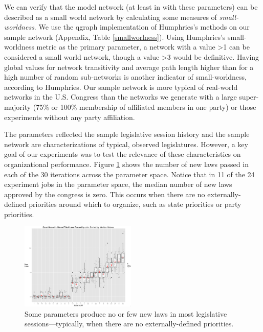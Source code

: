\documentclass[pdftex,12pt]{llncs}
\begin{document}
We can verify that the model network (at least in with these parameters) can be described as a small world network by calculating some measures of \textit{small-worldness}. 
We use the qgraph implementation \parencite{ec12} of Humphries's methods \parencite{hg08} on our sample network (Appendix, Table \ref{smallworlness}). 
Using Humphries's small-worldness metric as the primary parameter, a network with a value \textgreater 1 can be considered a small world network, though a value \textgreater 3 would be definitive. 
Having global values for network transitivity and average path length higher than for a high number of random sub-networks is another indicator of small-worldness, according to Humphries. 
Our sample network is more typical of real-world networks in the U.S. Congress than the networks we generate with a large super-majority (75\% or 100\% membership of affiliated members in one party) or those experiments without any party affiliation. 

The parameters reflected the sample legislative session history and the sample network are characterizations of typical, observed legislatures. 
However, a key goal of our experiments was to test the relevance of these characteristics on organizational performance.  
Figure \ref{newlaws} shows the number of new laws passed in each of the 30 iterations across the parameter space. 
Notice that in 11 of the 24 experiment jobs in the parameter space, the median number of new laws approved by the congress is zero.
This occurs when there are no externally-defined priorities around which to organize, such as state priorities or party priorities.

\begin{figure}
  \includegraphics[width=0.49\textwidth]{laws_byJob_jitterQuants.eps}
 \caption[ ]{Some parameters produce no or few new laws in most legislative sessions---typically, when there are no externally-defined priorities.}
 \label{newlaws}
\end{figure}
\end{document}
